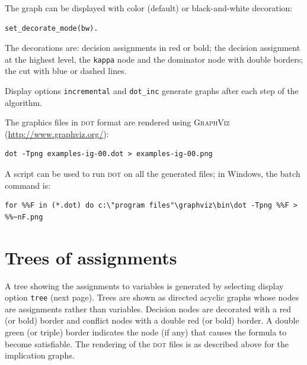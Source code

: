 \documentclass[11pt]{article}
\newcommand*{\p}[1]{\textup{\texttt{#1}}}
\newcommand*{\dt}{\textsc{dot}}
\begin{document}
The graph can be displayed with color (default) or black-and-white
decoration:

\begin{verbatim}
set_decorate_mode(bw).
\end{verbatim}

The decorations are: decision assignments in red or bold; the decision assignment at the highest level, the \p{kappa} node and the dominator node with double borders; the cut with blue or dashed lines.

Display options \p{incremental} and \p{dot\_inc} generate graphs after
each step of the algorithm.

The graphics files in \dt{} format are rendered using
\textsc{GraphViz} (\url{http://www.graphviz.org/}):

\begin{verbatim}
dot -Tpng examples-ig-00.dot > examples-ig-00.png
\end{verbatim}

A script can be used to run \dt{} on all the generated files; in
Windows, the batch command is:

\begin{verbatim}
for %%F in (*.dot) do c:\"program files"\graphviz\bin\dot -Tpng %%F > %%~nF.png
\end{verbatim}


\section{Trees of assignments}

A tree showing the assignments to variables is generated by selecting
display option \p{tree} (next page). Trees are shown as directed acyclic
graphs whose nodes are assignments rather than variables. Decision nodes
are decorated with a red (or bold) border and conflict nodes with a
double red (or bold) border. A double green (or triple) border
indicates the node (if any) that causes the formula to become
satisfiable. The rendering of the \dt{} files is as described above for
the implication graphs.
\end{document}

